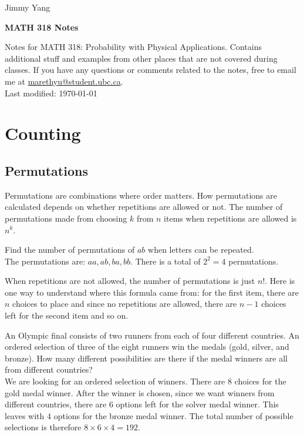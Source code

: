 \documentclass[12pt, a4paper]{article}
\newcommand{\doctitle}{MATH 318 Notes}
\newcommand{\name}{Jimmy Yang}
\newcounter{exa}
\begin{document}
\begin{flushright}
\name
\end{flushright}

\begin{center}
\Large
\bfseries
\doctitle
\end{center}

\thispagestyle{plain}

\begin{center}
Notes for MATH 318: Probability with Physical Applications. Contains additional stuff and examples from other places that are not covered during classes. If you have any questions or comments related to the notes, free to email me at \href{mailto:marethyu@student.ubc.ca}{marethyu@student.ubc.ca}. \\
Last modified: \today
\end{center}

\tableofcontents

\section{Counting}

\subsection{Permutations}

Permutations are combinations where order matters. How permutations are calculated depends on whether repetitions are allowed or not. The number of permutations made from choosing $k$ from $n$ items when repetitions are allowed is $n^k$.

\begin{texample}
Find the number of permutations of $ab$ when letters can be repeated. \\

The permutations are: $aa, ab, ba, bb$. There is a total of $2^2=4$ permutations.
\end{texample}

When repetitions are not allowed, the number of permutations is just $n!$. Here is one way to understand where this formula came from: for the first item, there are $n$ choices to place and since no repetitions are allowed, there are $n-1$ choices left for the second item and so on.

\begin{texample}
An Olympic final consists of two runners from each of four different countries. An ordered selection of three of the eight runners win the medals (gold, silver, and bronze). How many different possibilities are there if the medal winners are all from different countries? \\

We are looking for an ordered selection of winners. There are $8$ choices for the gold medal winner. After the winner is chosen, since we want winners from different countries, there are $6$ options left for the solver medal winner. This leaves with $4$ options for the bronze medal winner. The total number of possible selections is therefore $8\times6\times4=192$.
\end{texample}
\end{document}
